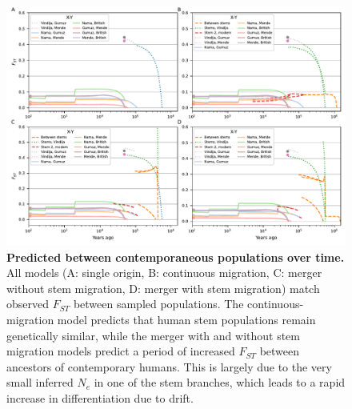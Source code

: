 \documentclass[]{article}
\begin{document}
\begin{figure}[ht]
    \centering
    \includegraphics[width=\textwidth]{figures/supp-fsts-all-models.pdf}
    \caption{
        \textbf{Predicted  between contemporaneous populations over time.}
        All models (A: single origin, B: continuous migration, C: merger without stem
        migration, D: merger with stem migration) match observed $F_{ST}$ between
        sampled populations. The continuous-migration model predicts that human stem
        populations remain genetically similar, while the merger with and without
        stem migration models predict a period of increased $F_{ST}$ between ancestors
        of contemporary humans.
        This is largely due to the very small inferred $N_e$ in one of
        the stem branches, which leads to a rapid increase in differentiation due to
        drift.
    }
    \label{fig:supp-FST-panels}
\end{figure}
\end{document}
